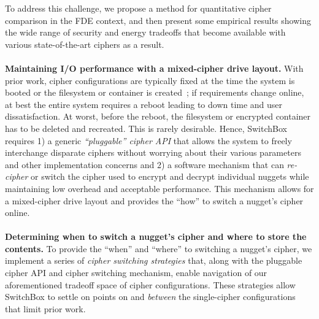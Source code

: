 To address this challenge, we propose a method for quantitative cipher comparison in the
FDE context, and then present some empirical results showing the wide range of
security and energy tradeoffs that become available with various
state-of-the-art ciphers as a result.\\
\\
\textbf{Maintaining I/O performance with a mixed-cipher drive layout.} With
prior work, cipher configurations are typically fixed at the time the system is
booted or the filesystem or container is created~\cite{CiteAllTheFilesystems};
if requirements change online, at best the entire system requires a reboot
leading to down time and user dissatisfaction. At worst, before the reboot, the
filesystem or encrypted container has to be deleted and recreated. This is
rarely desirable. Hence, SwitchBox requires 1) a generic \emph{``pluggable''
cipher API} that allows the system to freely interchange disparate ciphers
without worrying about their various parameters and other implementation
concerns and 2) a software mechanism that can \emph{re-cipher} or switch the
cipher used to encrypt and decrypt individual nuggets while maintaining low
overhead and acceptable performance. This mechanism allows for a mixed-cipher
drive layout and provides the ``how'' to switch a nugget's cipher online.\\
\\
\textbf{Determining when to switch a nugget's cipher and where to store the
contents.} To provide the ``when'' and ``where'' to switching a nugget's cipher,
we implement a series of \textit{cipher switching strategies} that, along with
the pluggable cipher API and cipher switching mechanism, enable navigation of
our aforementioned tradeoff space of cipher configurations. These strategies
allow SwitchBox to settle on points on and \emph{between} the single-cipher
configurations that limit prior work.

